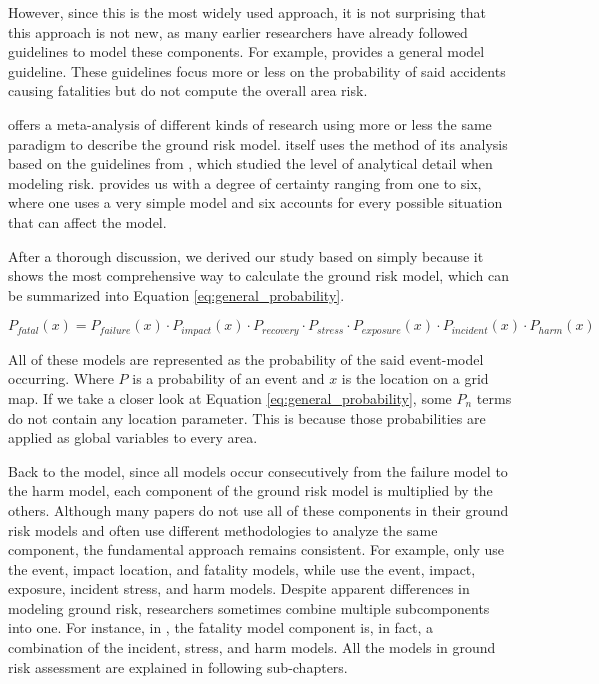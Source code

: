 \documentclass[12pt]{report}
\begin{document}
        However, since this is the most widely used approach, it is not surprising that this approach is not new, as
        many earlier researchers have already followed guidelines to model these components. For example,
        \cite{breunig_modeling_2018} provides a general model guideline. These guidelines focus more or less on the
        probability of said accidents causing fatalities but do not compute the overall area risk.
            

        \pagebreak
        \cite{washington_review_2017} offers a meta-analysis of different kinds of research using more or less the same
        paradigm to describe the ground risk model. \cite{washington_review_2017} itself uses the method of its analysis
        based on the guidelines from \cite{pat-cornell_uncertainties_1996}, which studied the level of analytical detail
        when modeling risk. \cite{pat-cornell_uncertainties_1996} provides us with a degree of certainty ranging from
        one to six, where one uses a very simple model and six accounts for every possible situation that can affect the
        model.
            
        After a thorough discussion, we derived our study based on \cite{primatesta_ground_2020} simply because it shows
        the most comprehensive way to calculate the ground risk model, which can be summarized into Equation
        \ref{eq:general_probability}.
        
        \begin{equation}\label{eq:general_probability}
            P_{fatal}(x) = P_{failure}(x) \cdot P_{impact}(x) \cdot P_{recovery} \cdot P_{stress} \cdot P_{exposure}(x) \cdot P_{incident}(x) \cdot P_{harm}(x)
        \end{equation}
        
        All of these models are represented as the probability of the said event-model occurring. Where \(P\) is a
        probability of an event and \(x\) is the location on a grid map. If we take a closer look at Equation
        \ref{eq:general_probability}, some \(P_n\) terms do not contain any location parameter. This is because those
        probabilities are applied as global variables to every area. 
        
        Back to the model, since all models occur consecutively from the failure model to the harm model, each component
        of the ground risk model is multiplied by the others. Although many papers do not use all of these components in
        their ground risk models and often use different methodologies to analyze the same component, the fundamental
        approach remains consistent. For example, \cite{primatesta_ground_2020} only use the event, impact location, and
        fatality models, while \cite{kim_risk-based_2022} use the event, impact, exposure, incident stress, and harm
        models. Despite apparent differences in modeling ground risk, researchers sometimes combine multiple
        subcomponents into one. For instance, in \cite{primatesta_ground_2020}, the fatality model component is, in
        fact, a combination of the incident, stress, and harm models. All the models in ground risk assessment are
        explained in following sub-chapters.
\end{document}
